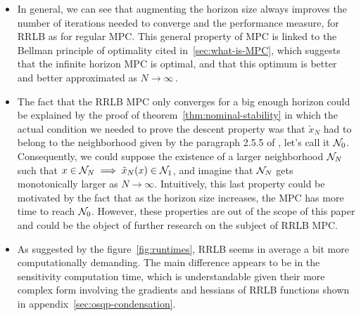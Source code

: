 \documentclass[12pt]{article}
\begin{document}
\begin{itemize}[label=\textbullet]
	\item In general, we can see that augmenting the horizon size always improves the number of iterations needed to converge and the performance measure, for RRLB as for regular MPC.
	This general property of MPC is linked to the Bellman principle of optimality cited in~\ref{sec:what-is-MPC}, which suggests that the infinite horizon MPC is optimal, and that this optimum is better and better approximated as $N\to\infty$\,.

	\item The fact that the RRLB MPC only converges for a big enough horizon could be explained by the proof of theorem~\ref{thm:nominal-stability} in which the actual condition we needed to prove the descent property was that $\tilde{x}_N$ had to belong to the neighborhood given by the paragraph 2.5.5 of \cite{MPC-book}, let's call it $\mathcal{N}_0$.
	Consequently, we could suppose the existence of a larger neighborhood $\mathcal{N}_N$ such that $x\in\mathcal{N}_N\implies \tilde{x}_N(x)\in\mathcal{N}_1$, and imagine that $\mathcal{N}_N$ gets monotonically larger as $N\to\infty$.
	Intuitively, this last property could be motivated by the fact that as the horizon size increases, the MPC has more time to reach $\mathcal{N}_0$.
	However, these properties are out of the scope of this paper and could be the object of further research on the subject of RRLB MPC.

	\item As suggested by the figure~\ref{fig:runtimes}, RRLB seems in average a bit more computationally demanding.
	The main difference appears to be in the sensitivity computation time, which is understandable given their more complex form involving the gradients and hessians of RRLB functions shown in appendix~\ref{sec:osqp-condensation}.


\end{itemize}
\end{document}
